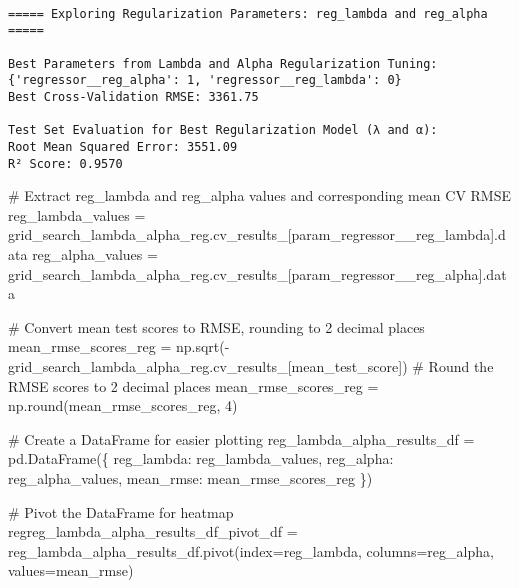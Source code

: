 \documentclass[
  letterpaper,
  DIV=11,
  numbers=noendperiod]{scrreprt}
\newenvironment{Shaded}{\begin{snugshade}}{\end{snugshade}}
\newcommand{\BuiltInTok}[1]{\textcolor[rgb]{0.00,0.23,0.31}{#1}}
\newcommand{\CommentTok}[1]{\textcolor[rgb]{0.37,0.37,0.37}{#1}}
\newcommand{\DecValTok}[1]{\textcolor[rgb]{0.68,0.00,0.00}{#1}}
\newcommand{\NormalTok}[1]{\textcolor[rgb]{0.00,0.23,0.31}{#1}}
\newcommand{\OperatorTok}[1]{\textcolor[rgb]{0.37,0.37,0.37}{#1}}
\newcommand{\StringTok}[1]{\textcolor[rgb]{0.13,0.47,0.30}{#1}}
\begin{document}
\begin{verbatim}

===== Exploring Regularization Parameters: reg_lambda and reg_alpha =====

Best Parameters from Lambda and Alpha Regularization Tuning:
{'regressor__reg_alpha': 1, 'regressor__reg_lambda': 0}
Best Cross-Validation RMSE: 3361.75

Test Set Evaluation for Best Regularization Model (λ and α):
Root Mean Squared Error: 3551.09
R² Score: 0.9570
\end{verbatim}

\begin{Shaded}
\begin{Highlighting}[]
\CommentTok{\# Extract reg\_lambda and reg\_alpha values and corresponding mean CV RMSE}
\NormalTok{reg\_lambda\_values }\OperatorTok{=}\NormalTok{ grid\_search\_lambda\_alpha\_reg.cv\_results\_[}\StringTok{\textquotesingle{}param\_regressor\_\_reg\_lambda\textquotesingle{}}\NormalTok{].data}
\NormalTok{reg\_alpha\_values }\OperatorTok{=}\NormalTok{ grid\_search\_lambda\_alpha\_reg.cv\_results\_[}\StringTok{\textquotesingle{}param\_regressor\_\_reg\_alpha\textquotesingle{}}\NormalTok{].data}

\CommentTok{\# Convert mean test scores to RMSE, rounding to 2 decimal places}
\NormalTok{mean\_rmse\_scores\_reg }\OperatorTok{=}\NormalTok{ np.sqrt(}\OperatorTok{{-}}\NormalTok{grid\_search\_lambda\_alpha\_reg.cv\_results\_[}\StringTok{\textquotesingle{}mean\_test\_score\textquotesingle{}}\NormalTok{])}
\CommentTok{\# Round the RMSE scores to 2 decimal places}
\NormalTok{mean\_rmse\_scores\_reg }\OperatorTok{=}\NormalTok{ np.}\BuiltInTok{round}\NormalTok{(mean\_rmse\_scores\_reg, }\DecValTok{4}\NormalTok{)}

\CommentTok{\# Create a DataFrame for easier plotting}
\NormalTok{reg\_lambda\_alpha\_results\_df }\OperatorTok{=}\NormalTok{ pd.DataFrame(\{}
    \StringTok{\textquotesingle{}reg\_lambda\textquotesingle{}}\NormalTok{: reg\_lambda\_values,}
    \StringTok{\textquotesingle{}reg\_alpha\textquotesingle{}}\NormalTok{: reg\_alpha\_values,}
    \StringTok{\textquotesingle{}mean\_rmse\textquotesingle{}}\NormalTok{: mean\_rmse\_scores\_reg}
\NormalTok{\})}

\CommentTok{\# Pivot the DataFrame for heatmap}
\NormalTok{regreg\_lambda\_alpha\_results\_df\_pivot\_df }\OperatorTok{=}\NormalTok{ reg\_lambda\_alpha\_results\_df.pivot(index}\OperatorTok{=}\StringTok{\textquotesingle{}reg\_lambda\textquotesingle{}}\NormalTok{, columns}\OperatorTok{=}\StringTok{\textquotesingle{}reg\_alpha\textquotesingle{}}\NormalTok{, values}\OperatorTok{=}\StringTok{\textquotesingle{}mean\_rmse\textquotesingle{}}\NormalTok{)}


\end{Highlighting}
\end{Shaded}
\end{document}
